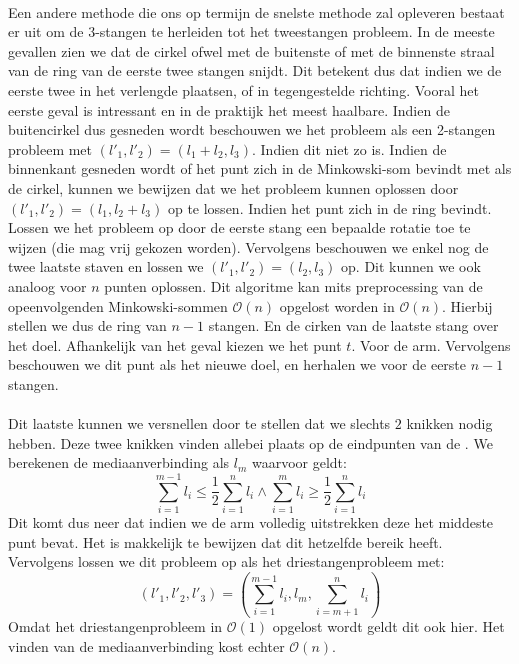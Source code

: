 \documentclass[a4paper,titlepage]{article}
\newcommand{\termen}[1]{\index{#1}\textbf{\sffamily{#1}}}
\newcommand{\brak}[1]{\left(#1\right)}
\newcommand{\bigoh}[1]{\ensuremath{\mathcal{O}\left(#1\right)}}
\begin{document}
\paragraph{}
Een andere methode die ons op termijn de snelste methode zal opleveren bestaat er uit om de 3-stangen te herleiden tot het tweestangen probleem. In de meeste gevallen zien we dat de cirkel ofwel met de buitenste of met de binnenste straal van de ring van de eerste twee stangen snijdt. Dit betekent dus dat indien we de eerste twee in het verlengde plaatsen, of in tegengestelde richting. Vooral het eerste geval is intressant en in de praktijk het meest haalbare. Indien de buitencirkel dus gesneden wordt beschouwen we het probleem als een 2-stangen probleem met $\brak{l'_1,l'_2}=\brak{l_1+l_2,l_3}$. Indien dit niet zo is. Indien de binnenkant gesneden wordt of het punt zich in de Minkowski-som bevindt met als de cirkel, kunnen we bewijzen dat we het probleem kunnen oplossen door $\brak{l'_1,l'_2}=\brak{l_1,l_2+l_3}$ op te lossen. Indien het punt zich in de ring bevindt. Lossen we het probleem op door de eerste stang een bepaalde rotatie toe te wijzen (die mag vrij gekozen worden). Vervolgens beschouwen we enkel nog de twee laatste staven en lossen we $\brak{l'_1,l'_2}=\brak{l_2,l_3}$ op. Dit kunnen we ook analoog voor $n$ punten oplossen.
Dit algoritme kan mits preprocessing van de opeenvolgenden Minkowski-sommen \bigoh{n} opgelost worden in \bigoh{n}. Hierbij stellen we dus de ring van $n-1$ stangen. En de cirken van de laatste stang over het doel. Afhankelijk van het geval kiezen we het punt $t$. Voor de arm. Vervolgens beschouwen we dit punt als het nieuwe doel, en herhalen we voor de eerste $n-1$ stangen.
\paragraph{}
Dit laatste kunnen we versnellen door te stellen dat we slechts $2$ knikken nodig hebben. Deze twee knikken vinden allebei plaats op de eindpunten van de \termen{mediaanverbinding}. We berekenen de mediaanverbinding als $l_m$ waarvoor geldt:
\begin{equation}
\displaystyle\sum_{i=1}^{m-1}{l_i}\leq\displaystyle\frac{1}{2}\displaystyle\sum_{i=1}^{n}{l_i}\wedge\displaystyle\sum_{i=1}^{m}{l_i}\geq\displaystyle\frac{1}{2}\displaystyle\sum_{i=1}^{n}{l_i}
\end{equation}
Dit komt dus neer dat indien we de arm volledig uitstrekken deze het middeste punt bevat. Het is makkelijk te bewijzen dat dit hetzelfde bereik heeft. Vervolgens lossen we dit probleem op als het driestangenprobleem met:
\begin{equation}
\brak{l'_1,l'_2,l'_3}=\brak{\displaystyle\sum_{i=1}^{m-1}{l_i},l_m,\displaystyle\sum_{i=m+1}^{n}{l_i}}
\end{equation}
Omdat het driestangenprobleem in \bigoh{1} opgelost wordt geldt dit ook hier. Het vinden van de mediaanverbinding kost echter \bigoh{n}.
\begin{center}
\begin{Huge}
\end{Huge}
\end{center}
\end{document}
